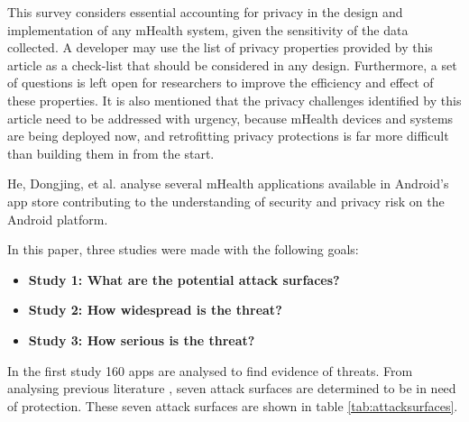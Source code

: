 
This survey considers essential accounting for privacy in the design and implementation of any mHealth system, given the sensitivity of the data collected. A developer may use the list of privacy properties provided by this article as a check-list that should be considered in any design. Furthermore, a set of questions is left open for researchers to improve the efficiency and effect of these properties. It is also mentioned that the privacy challenges identified by this article need to be addressed with urgency, because mHealth devices and systems are being deployed now, and retrofitting privacy protections is far more difficult than building them in from the start.

He, Dongjing, et al. \cite{he2014security} analyse several mHealth applications available in Android's app store contributing to the understanding of security and privacy risk on the Android platform.

In this paper, three studies were made with the following goals:
\begin{itemize}
	\item \textbf{Study 1: What are the potential attack surfaces?}
	\item \textbf{Study 2: How widespread is the threat?}
	\item \textbf{Study 3: How serious is the threat?}
\end{itemize}

 In the first study 160 apps are analysed to find evidence of threats. From analysing previous literature \cite{zhou2013identity,naveed2014inside,aviv2012practicality,cai2012practicality,chin2011analyzing,fsecure,sevenwaystohangyourselfwithandroid}, seven attack surfaces are determined to be in need of protection. These seven attack surfaces are shown in table \ref{tab:attacksurfaces}.

